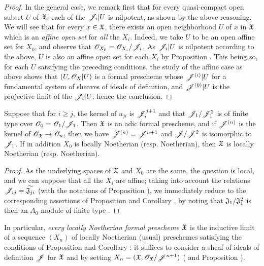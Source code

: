 \begin{proof}
In the general case, we remark first that for every quasi-compact open subset $U$ of $\mathfrak{X}$, each of the $\mathscr{J}_i|U$ is nilpotent, as shown by the above reasoning.
We will see that for every $x\in\mathfrak{X}$, there exists an open neighborhood $U$ of $x$ in $\mathfrak{X}$ which is an \emph{affine open set} for \emph{all} the $X_i$.
Indeed, we take $U$ to be an open affine set for $X_0$, and observe that $\mathscr{O}_{X_0}=\mathscr{O}_{X_i}/\mathscr{J}_i$.
As $\mathscr{J}_i|U$ is nilpotent according to the above, $U$ is also an affine open set for each $X_i$ by Proposition .
This being so, for each $U$ satsifying the preceding conditions, the study of the affine case as above shows that $(U,\mathscr{O}_X|U)$ is a formal prescheme whose $\mathscr{J}^{(i)}|U$ for a fundamental system of sheaves of ideals of definition, and $\mathscr{J}^{(0)}|U$ is the projective limit of the $\mathscr{J}_i|U$; hence the conclusion.
\end{proof}

\begin{cor}[10.6.4]
\label{1.10.6.4}
Suppose that for $i\geqslant j$, the kernel of $u_{ji}$ is $\mathscr{J}_i^{j+1}$ and that $\mathscr{J}_1/\mathscr{J}_1^2$
is of finite type over $\mathscr{O}_0=\mathscr{O}_1/\mathscr{J}_1$.
Then $\mathfrak{X}$ is an adic formal prescheme, and if $\mathscr{J}^{(n)}$ is the kernel of $\OO_\fk{X}\to\OO_n$, then we have $\mathscr{J}^{(n)}=\mathscr{J}^{n+1}$ and $\mathscr{J}/\mathscr{J}^2$ is isomorphic to $\mathscr{J}_1$.
If in addition $X_0$ is locally Noetherian (resp. Noetherian), then $\mathfrak{X}$ is locally Noetherian (resp. Noetherian).
\end{cor}

\begin{proof}
\label{proof-1.10.6.4}
As the underlying spaces of $\mathfrak{X}$ and $X_0$ are the same, the question is local, and we can suppose that all the $X_i$ are affine; taking into account the relations $\mathscr{J}_{ij}=\widetilde{\mathfrak{J}_{ji}}$ (with the notations of Proposition ), we immediately reduce to the corresponding assertions of Proposition  and Corollary , by noting that $\mathfrak{J}_1/\mathfrak{J}_1^2$ is then an $A_0$-module of finite type .
\end{proof}

In particular, \emph{every locally Noetherian formal prescheme $\mathfrak{X}$} is the inductive limit of a sequence $(X_n)$ of locally Noetherian (usual) preschemes satisfying the conditions of Proposition  and Corollary : it suffices to consider a sheaf of ideals of definition $\mathscr{J}$ for $\mathfrak{X}$  and by setting $X_n=(\mathfrak{X},\mathscr{O}_\mathfrak{X}/\mathscr{J}^{n+1})$ ( and Proposition ).

